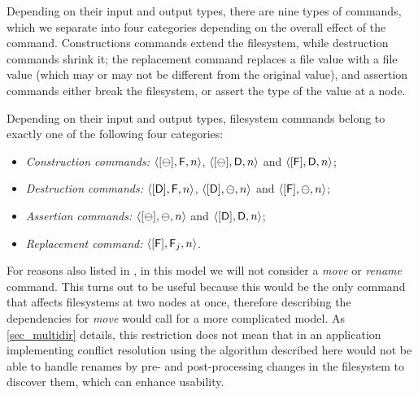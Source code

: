 \myskip
Depending on their input and output types, there are nine types of commands,
which we separate into four categories depending on the overall effect of the command.
Constructions commands extend the filesystem,
while destruction commands shrink it;
the replacement command replaces a file value with a file value
(which may or may not be different from the original value),
and assertion commands either break the filesystem, or assert the type of the value at a node.
\begin{mydef}
Depending on their input and output types, filesystem commands
belong to exactly one of the following four categories:
\begin{itemize}
\item[]\emph{Construction commands:}
    $\langle{[\ominus],\mathsf{F},n}\rangle$, $\langle{[\ominus],\mathsf{D},n}\rangle$ and $\langle{[\mathsf{F}],\mathsf{D},n}\rangle$;
\item[]\emph{Destruction commands:}
    $\langle{[\mathsf{D}],\mathsf{F},n}\rangle$, $\langle{[\mathsf{D}],\ominus,n}\rangle$ and $\langle{[\mathsf{F}],\ominus,n}\rangle$;
\item[]\emph{Assertion commands:}
    $\langle{[\ominus],\ominus,n}\rangle$ and $\langle{[\mathsf{D}],\mathsf{D},n}\rangle$;
\item[]\emph{Replacement command:}
    $\langle{[\mathsf{F}],\mathsf{F}_j,n}\rangle$.
\qedhere
\end{itemize}
\end{mydef}



\myskip
For reasons also listed in \cite{NREC}, in this model we will not consider
a \textit{move} or \textit{rename} command.
This turns out to be useful because this would be the only command that affects
filesystems at two nodes at once, therefore describing 
the dependencies for \textit{move} would call for a more complicated model.
As \cref{sec_multidir} details, this restriction does not mean that in an application
implementing conflict resolution using the algorithm described here would not be
able to handle renames by pre- and post-processing changes in the filesystem to
discover them, which can enhance usability.
